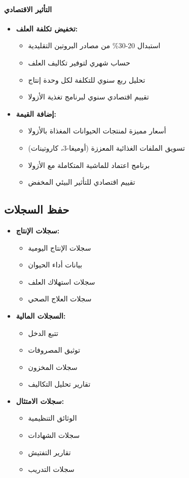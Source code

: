 \paragraph{التأثير الاقتصادي}
\begin{itemize}
    \item \textbf{تخفيض تكلفة العلف:}
    \begin{itemize}
        \item استبدال 20-30\% من مصادر البروتين التقليدية
        \item حساب شهري لتوفير تكاليف العلف
        \item تحليل ربع سنوي للتكلفة لكل وحدة إنتاج
        \item تقييم اقتصادي سنوي لبرنامج تغذية الأزولا
    \end{itemize}
    \item \textbf{إضافة القيمة:}
    \begin{itemize}
        \item أسعار مميزة لمنتجات الحيوانات المغذاة بالأزولا
        \item تسويق الملفات الغذائية المعززة (أوميغا-3، كاروتينات)
        \item برنامج اعتماد للماشية المتكاملة مع الأزولا
        \item تقييم اقتصادي للتأثير البيئي المخفض
    \end{itemize}
\end{itemize}

\subsection{حفظ السجلات}
\begin{itemize}
    \item \textbf{سجلات الإنتاج:}
    \begin{itemize}
        \item سجلات الإنتاج اليومية
        \item بيانات أداء الحيوان
        \item سجلات استهلاك العلف
        \item سجلات العلاج الصحي
    \end{itemize}
    
    \item \textbf{السجلات المالية:}
    \begin{itemize}
        \item تتبع الدخل
        \item توثيق المصروفات
        \item سجلات المخزون
        \item تقارير تحليل التكاليف
    \end{itemize}
    
    \item \textbf{سجلات الامتثال:}
    \begin{itemize}
        \item الوثائق التنظيمية
        \item سجلات الشهادات
        \item تقارير التفتيش
        \item سجلات التدريب
    \end{itemize}
\end{itemize}

